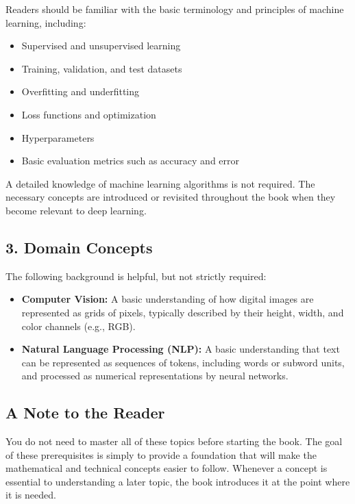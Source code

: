 \documentclass[11pt,a4paper,oneside]{book}
\begin{document}
Readers should be familiar with the basic terminology and principles of machine learning, including:

\begin{itemize}
    \item Supervised and unsupervised learning
    \item Training, validation, and test datasets
    \item Overfitting and underfitting
    \item Loss functions and optimization
    \item Hyperparameters
    \item Basic evaluation metrics such as accuracy and error
\end{itemize}

A detailed knowledge of machine learning algorithms is not required. The necessary concepts are introduced or revisited throughout the book when they become relevant to deep learning.

\subsection*{3. Domain Concepts}

The following background is helpful, but not strictly required:

\begin{itemize}
    \item \textbf{Computer Vision:} A basic understanding of how digital images are represented as grids of pixels, typically described by their height, width, and color channels (e.g., RGB).

    \item \textbf{Natural Language Processing (NLP):} A basic understanding that text can be represented as sequences of tokens, including words or subword units, and processed as numerical representations by neural networks.
\end{itemize}

\subsection*{A Note to the Reader}

You do not need to master all of these topics before starting the book. The goal of these prerequisites is simply to provide a foundation that will make the mathematical and technical concepts easier to follow. Whenever a concept is essential to understanding a later topic, the book introduces it at the point where it is needed.
\end{document}
